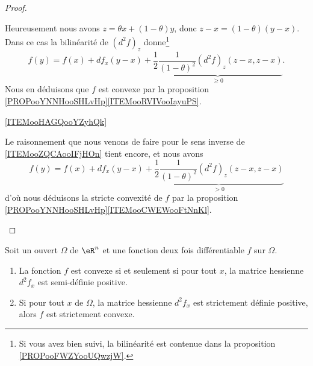 \begin{proof}
\begin{subproof}
        Heureusement nous avons \( z=\theta x+(1-\theta)y\), donc \( z-x=(1-\theta)(y-x)\). Dans ce cas la bilinéarité de \( (d^2f)_z\) donne\footnote{Si vous avez bien suivi, la bilinéarité est contenue dans la proposition \ref{PROPooFWZYooUQwzjW}.}
        \begin{equation}
            f(y)=f(x)+df_x(y-x)+\underbrace{\frac{ 1 }{2}\frac{1}{ (1-\theta)^2 }(d^2f)_z(z-x,z-x)}_{\geq 0}.
        \end{equation}
        Nous en déduisons que \( f\) est convexe par la proposition \ref{PROPooYNNHooSHLvHp}\ref{ITEMooRVIVooIayuPS}.
    \item[\ref{ITEMooHAGQooYZyhQk}]

        Le raisonnement que nous venons de faire pour le sens inverse de \ref{ITEMooZQCAooIFjHOn} tient encore, et nous avons
        \begin{equation}
            f(y)=f(x)+df_x(y-x)+\underbrace{\frac{ 1 }{2}\frac{1}{ (1-\theta)^2 }(d^2f)_z(z-x,z-x)}_{> 0}
        \end{equation}
        d'où nous déduisons la stricte convexité de \( f\) par la proposition \ref{PROPooYNNHooSHLvHp}\ref{ITEMooCWEWooFtNnKl}.
    \end{subproof}
\end{proof}

\begin{corollary}       \label{CORooMBQMooWBAIIH}
    Soit un ouvert \( \Omega\) de \( \eR^n\) et une fonction deux fois différentiable \( f\) sur \( \Omega\).
    \begin{enumerate}
        \item   \label{ITEMooUAFTooXfCviI}
            La fonction \( f\) est convexe si et seulement si pour tout \( x\), la matrice hessienne \( d^2f_x\) est semi-définie positive.
        \item   \label{ITEMooDGISooPlRLOd}
            Si pour tout \( x\) de \( \Omega\), la matrice hessienne \( d^2f_x\) est strictement définie positive, alors \( f \) est strictement convexe.
    \end{enumerate}
\end{corollary}

